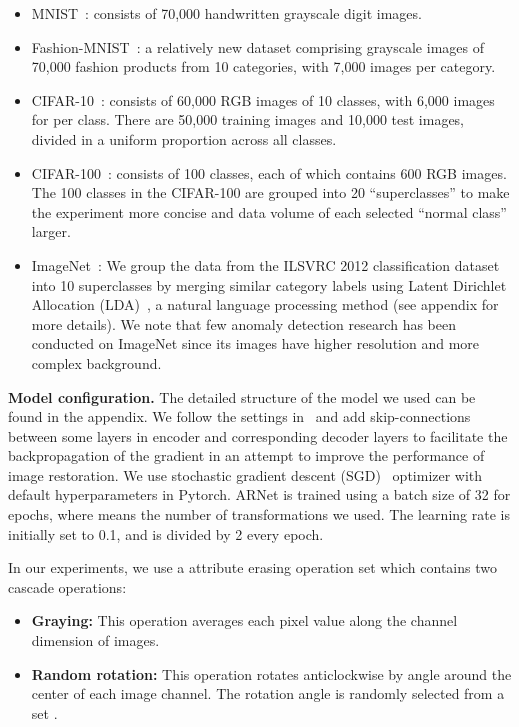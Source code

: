 \documentclass[journal]{IEEEtran}
\begin{document}
\begin{itemize}
    \item
    MNIST~\cite{lecun1998mnist}: consists of 70,000  handwritten grayscale digit images.
    \item
    Fashion-MNIST~\cite{xiao2017fashion}: a relatively new dataset comprising  grayscale images of 70,000 fashion products from 10 categories, with 7,000 images per category. 
    \item CIFAR-10~\cite{krizhevsky2009learning}: consists of 60,000  RGB images of 10 classes, with 6,000 images for per class. There are 50,000 training images and 10,000 test images, divided in a uniform proportion across all classes. 
    \item
    CIFAR-100~\cite{krizhevsky2009learning}: consists of 100 classes, each of which contains 600 RGB images. The 100 classes in the CIFAR-100 are grouped into 20 ``superclasses'' to make the experiment more concise and data volume of each selected ``normal class'' larger. 
    \item
    ImageNet~\cite{russakovsky2015imagenet}: We group the data from the ILSVRC 2012 classification dataset~\cite{russakovsky2015imagenet} into 10 superclasses by merging similar category labels using Latent Dirichlet Allocation (LDA)~\cite{blei2003latent}, a natural language processing method (see appendix for more details). We note that few anomaly detection research has been conducted on ImageNet since its images have higher resolution and more complex background.
\end{itemize}

\noindent\textbf{Model configuration.} The detailed structure of the model we used can be found in the appendix. We follow the settings in~\cite{unet, akccay2019skip,isola2017image} and add skip-connections between some layers in encoder and corresponding decoder layers to facilitate the backpropagation of the gradient in an attempt to improve the performance of image restoration. We use stochastic gradient descent (SGD)~\cite{bottou2010large} optimizer with default hyperparameters in Pytorch. ARNet is trained using a batch size of 32 for  epochs, where  means the number of transformations we used. The learning rate is initially set to 0.1, and is divided by 2 every  epoch. 

In our experiments, we use a attribute erasing operation set which contains two cascade operations:
\begin{itemize}
    \item {\bf Graying:} This operation averages each pixel value along the channel dimension of images.
    \item {\bf Random rotation:} This operation rotates  anticlockwise by angle  around the center of each image channel. The rotation angle  is randomly selected from a set .
\end{itemize}
\end{document}
